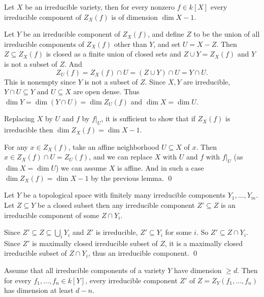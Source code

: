 \eproof

\bthrm

    Let $X$ be an irreducible variety, then for every nonzero $f\in k[X]$ every irreducible component of $Z_X(f)$ is of dimension $\dim X-1$.

\ethrm

\bproof

    Let $Y$ be an irreducible component of $Z_X(f)$, and define $Z$ to be the union of all irreducible components of $Z_X(f)$ other than $Y$, and set $U=X-Z$.
    Then $Z\subseteq Z_X(f)$ is closed as a finite union of closed sets and $Z\cup Y=Z_X(f)$ and $Y$ is not a subset of $Z$.
    And
    $$ Z_U(f) = Z_X(f) \cap U = (Z\cup Y) \cap U = Y\cap U . $$
    This is nonempty since $Y$ is not a subset of $Z$.
    Since $X,Y$ are irreducible, $Y\cap U\subseteq Y$ and $U\subseteq X$ are open dense.
    Thus $\dim Y=\dim(Y\cap U)=\dim Z_U(f)$ and $\dim X=\dim U$.

    Replacing $X$ by $U$ and $f$ by $f|_U$, it is sufficient to show that if $Z_X(f)$ is irreducible then $\dim Z_X(f)=\dim X-1$.

    For any $x\in Z_X(f)$, take an affine neighborhood $U\subseteq X$ of $x$.
    Then $x\in Z_X(f)\cap U=Z_U(f)$, and we can replace $X$ with $U$ and $f$ with $f|_U$ (as $\dim X=\dim U$) we can assume $X$ is affine.
    And in such a case $\dim Z_X(f)=\dim X-1$ by the previous lemma.
    \qed

\eproof

\blemm

    Let $Y$ be a topological space with finitely many irreducible components $Y_1,\dots,Y_m$.
    Let $Z\subseteq Y$ be a closed subset then any irreducible component $Z'\subseteq Z$ is an irreducible component of some $Z\cap Y_i$.

\elemm

\bproof

    Since $Z'\subseteq Z\subseteq\bigcup_iY_i$ and $Z'$ is irreducible, $Z'\subseteq Y_i$ for some $i$.
    So $Z'\subseteq Z\cap Y_i$.
    Since $Z'$ is maximally closed irreducible subset of $Z$, it is a maximally closed irreducible subset of $Z\cap Y_i$, thus an irreducible component.
    \qed

\eproof

\bcoro

    Assume that all irreducible components of a variety $Y$ have dimension $\geq d$.
    Then for every $f_1,\dots,f_n\in k[Y]$, every irreducible component $Z'$ of $Z=Z_Y(f_1,\dots,f_n)$ has dimension at least $d-n$.

